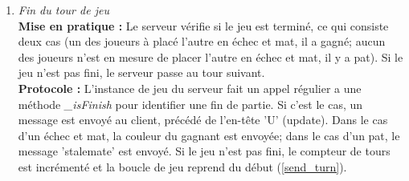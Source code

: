 \documentclass[10pt, a4paper]{article}
\begin{document}
\begin{enumerate}
\item \textit{Fin du tour de jeu} \\
\textbf{Mise en pratique :} Le serveur vérifie si le jeu est terminé, ce qui consiste deux cas (un des joueurs à placé l'autre en échec et mat, il a gagné; aucun des joueurs n'est en mesure de placer l'autre en échec et mat, il y a pat). Si le jeu n'est pas fini, le serveur passe au tour suivant.\\
\textbf{Protocole :} L'instance de jeu du serveur fait un appel régulier a une méthode \textit{\_isFinish} pour identifier une fin de partie. Si c'est le cas, un message est envoyé au client, précédé de l'en-tête 'U' (update). Dans le cas d'un échec et mat, la couleur du gagnant est envoyée; dans le cas d'un pat, le message 'stalemate' est envoyé. Si le jeu n'est pas fini, le compteur de tours est incrémenté et la boucle de jeu reprend du début (\ref{send_turn}).

\end{enumerate}
\end{document}
